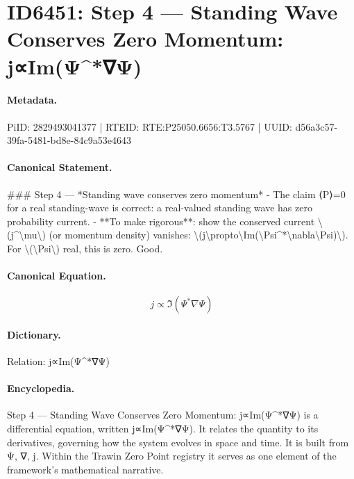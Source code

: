 \section*{ID6451: Step 4 — Standing Wave Conserves Zero Momentum: j∝Im(Ψ\textasciicircum{}*∇Ψ)}
\paragraph{Metadata.}
PiID: 2829493041377 | RTEID: RTE:P25050.6656:T3.5767 | UUID: d56a3c57-39fa-5481-bd8e-84c9a53e4643

\paragraph{Canonical Statement.}
\#\#\# Step 4 — *Standing wave conserves zero momentum* - The claim ⟨P⟩=0 for a real standing-wave is correct: a real-valued standing wave has zero probability current. - **To make rigorous**: show the conserved current \textbackslash{}(j\textasciicircum{}\textbackslash{}mu\textbackslash{}) (or momentum density) vanishes: \textbackslash{}(j\textbackslash{}propto\textbackslash{}Im(\textbackslash{}Psi\textasciicircum{}*\textbackslash{}nabla\textbackslash{}Psi)\textbackslash{}). For \textbackslash{}(\textbackslash{}Psi\textbackslash{}) real, this is zero. Good.

\paragraph{Canonical Equation.}
\[
j\propto\Im(\Psi^*\nabla\Psi)
\]

\paragraph{Dictionary.}
Relation: j∝Im(Ψ\textasciicircum{}*∇Ψ)

\paragraph{Encyclopedia.}
Step 4 — Standing Wave Conserves Zero Momentum: j∝Im(Ψ\textasciicircum{}*∇Ψ) is a differential equation, written j∝Im(Ψ\textasciicircum{}*∇Ψ). It relates the quantity to its derivatives, governing how the system evolves in space and time. It is built from Ψ, ∇, j. Within the Trawin Zero Point registry it serves as one element of the framework's mathematical narrative.
